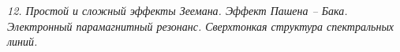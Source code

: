 \emph{12. Простой и сложный эффекты Зеемана. Эффект Пашена -- Бака. 
Электронный парамагнитный резонанс. Сверхтонкая структура спектральных 
линий.}

\newpage
